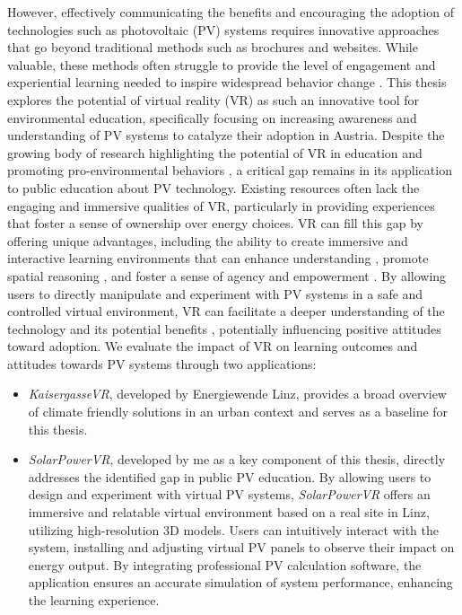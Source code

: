 \documentclass[draft, final]{vutinfth} %
\begin{document}
However, effectively communicating the benefits and encouraging the adoption of technologies such as photovoltaic (PV) systems requires innovative approaches that go beyond traditional methods such as brochures and websites. While valuable, these methods often struggle to provide the level of engagement and experiential learning needed to inspire widespread behavior change \cite{Hassan2020Digitality}. This thesis explores the potential of virtual reality (VR) as such an innovative tool for environmental education, specifically focusing on increasing awareness and understanding of PV systems to catalyze their adoption in Austria. Despite the growing body of research highlighting the potential of VR in education \cite{HuAu2018VrExperience,Merchant2014VrEffectiveness} and promoting pro-environmental behaviors \cite{Queiroz2023Efficacy,McEvoy2023Climate}, a critical gap remains in its application to public education about PV technology. Existing resources often lack the engaging and immersive qualities of VR, particularly in providing experiences that foster a sense of ownership over energy choices. VR can fill this gap by offering unique advantages, including the ability to create immersive and interactive learning environments that can enhance understanding \cite{HuAu2018VrExperience, Winn2002Immersion}, promote spatial reasoning \cite{Dalgarno2010Learning, Sung2015Effects, Winn2002Immersion}, and foster a sense of agency and empowerment \cite{Gee2009Deep}. By allowing users to directly manipulate and experiment with PV systems in a safe and controlled virtual environment, VR can facilitate a deeper understanding of the technology and its potential benefits \cite{Mikropoulos2011VrEducational}, potentially influencing positive attitudes toward adoption. We evaluate the impact of VR on learning outcomes and attitudes towards PV systems through two applications: 

\begin{itemize}
    \item \textit{KaisergasseVR}, developed by Energiewende Linz, provides a broad overview of climate friendly solutions in an urban context and serves as a baseline for this thesis.
    \item \textit{SolarPowerVR}, developed by me as a key component of this thesis, directly addresses the identified gap in public PV education. By allowing users to design and experiment with virtual PV systems, \textit{SolarPowerVR} offers an immersive and relatable virtual environment based on a real site in Linz, utilizing high-resolution 3D models. Users can intuitively interact with the system, installing and adjusting virtual PV panels to observe their impact on energy output. By integrating professional PV calculation software, the application ensures an accurate simulation of system performance, enhancing the learning experience.
\end{itemize}
\end{document}
